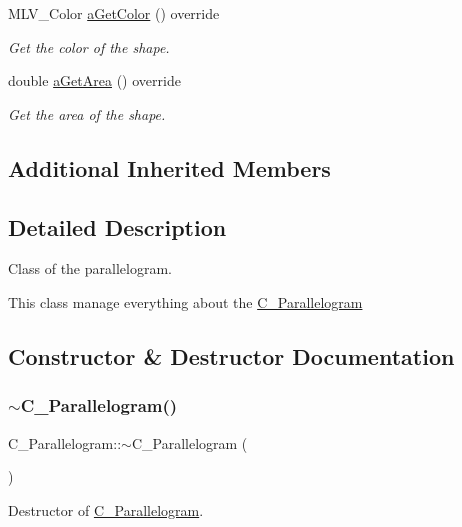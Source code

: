 \begin{DoxyCompactItemize}
M\+L\+V\+\_\+\+Color \hyperlink{classC__Parallelogram_afd5055e948fcd992be3cdd227c8b4bfb}{a\+Get\+Color} () override
\begin{DoxyCompactList}\small\item\em Get the color of the shape. \end{DoxyCompactList}\item 
double \hyperlink{classC__Parallelogram_a72b4509a33ee27331e5b9bdc8a3278e8}{a\+Get\+Area} () override
\begin{DoxyCompactList}\small\item\em Get the area of the shape. \end{DoxyCompactList}\end{DoxyCompactItemize}
\subsection*{Additional Inherited Members}


\subsection{Detailed Description}
Class of the parallelogram. 

This class manage everything about the \hyperlink{classC__Parallelogram}{C\+\_\+\+Parallelogram} 

\subsection{Constructor \& Destructor Documentation}
\mbox{\label{classC__Parallelogram_a2d7af48f3a26e8e07031e7c147a084a3}} 
\subsubsection{\texorpdfstring{$\sim$\+C\+\_\+\+Parallelogram()}{~C\_Parallelogram()}}
{\footnotesize\ttfamily C\+\_\+\+Parallelogram\+::$\sim$\+C\+\_\+\+Parallelogram (\begin{DoxyParamCaption}{ }\end{DoxyParamCaption})\hspace{0.3cm}{\ttfamily [override]}}



Destructor of \hyperlink{classC__Parallelogram}{C\+\_\+\+Parallelogram}. 


